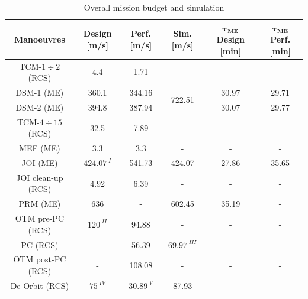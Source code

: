 \begin{table}[H]
    \renewcommand{\arraystretch}{1.3}
    \centering
    \begin{tabular}{|c|c|c|c|c|c|}
        \hline
        \textbf{Manoeuvres} & \textbf{Design} [m/s] & \textbf{Perf.} [m/s] & \textbf{Sim.} [m/s] & \textbf{$\boldsymbol{\tau_{ME}}$ Design} [min] & \textbf{$\boldsymbol{\tau_{ME}}$ Perf.} [min]  \\
        \hline
        TCM-$1\div2$ (RCS) \cite{juno_inner} & 4.4 & 1.71 & - & - & - \\
        \hline 
        \multicolumn{1}{|c|}{DSM-1 (ME) \cite{juno_inner}} & \multicolumn{1}{c|}{360.1} & \multicolumn{1}{c|}{344.16} & \multirow{2}{*}{722.51} & \multicolumn{1}{c|}{30.97} & \multicolumn{1}{c|}{29.71} \\
        \cline{1-3}
        \cline{5-6}
        \multicolumn{1}{|c|}{DSM-2 (ME) \cite{juno_inner}} & \multicolumn{1}{c|}{394.8} & \multicolumn{1}{c|}{387.94} & & \multicolumn{1}{c|}{30.07} & \multicolumn{1}{c|}{29.77} \\
        \hline
        TCM-$4\div15$ (RCS) \cite{juno_inner} & 32.5 & 7.89 & - & - & - \\
        \hline
        MEF (ME) \cite{juno_inner} & 3.3 & 3.3 & - & - & - \\
        \hline
        JOI (ME) \cite{otm} & $424.07^{\;I}$ & 541.73 & 424.07 & 27.86 & 35.65 \\
        \hline
        JOI clean-up (RCS) \cite{otm} & 4.92 & 6.39 & - & - & - \\
        \hline
        PRM (ME) \cite{otm} & 636 & - & 602.45 & 35.19 & - \\
        \hline
        OTM pre-PC (RCS) \cite{nasa_otm} & $120^{\;II}$ & 94.88 & - & - & - \\
        \hline 
        PC (RCS) & - & 56.39 & $69.97^{\;III}$ & - & - \\
        \hline
        OTM post-PC (RCS) & - & 108.08 & - & - & - \\
        \hline
        De-Orbit (RCS) \cite{spaceflight101} & $75^{\;IV}$ & $30.89^{\;V} $& 87.93 & - & -\\
        \hline
    \end{tabular}
    \caption{Overall mission budget and simulation}
    \label{table:deltav}
\end{table}

